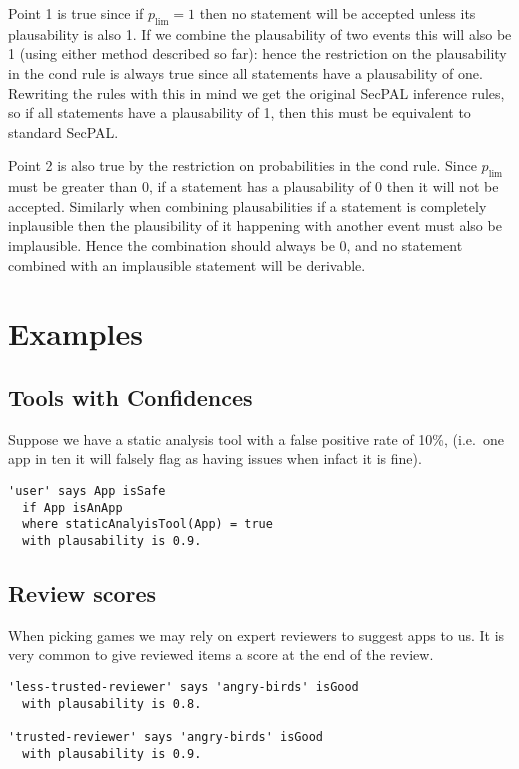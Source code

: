 \documentclass[a4paper]{article}
\begin{document}
Point 1 is true since if $p_{\text{lim}} = 1$ then no statement will be accepted unless its plausability is also 1.
If we combine the plausability of two events this will also be 1 (using either method described so far):
    hence the restriction on the plausability in the cond rule is always true since all statements have a plausability of one.
Rewriting the rules with this in mind we get the original SecPAL inference rules, so if all statements have a plausability of 1, then this must be equivalent to standard SecPAL.

Point 2 is also true by the restriction on probabilities in the cond rule.
Since $p_{\text{lim}}$ must be greater than 0, if a statement has a plausability of 0 then it will not be accepted.
Similarly when combining plausabilities if a statement is completely inplausible then the plausibility of it happening with another event must also be implausible.
Hence the combination should always be 0, and no statement combined with an implausible statement will be derivable.

\section{Examples}

\subsection{Tools with Confidences}

Suppose we have a static analysis tool with a false positive rate of 10\%, (i.e.~one app in ten it will falsely flag as having issues when infact it is fine).

\begin{lstlisting}
'user' says App isSafe
  if App isAnApp
  where staticAnalyisTool(App) = true
  with plausability is 0.9.
\end{lstlisting}

\subsection{Review scores}

When picking games we may rely on expert reviewers to suggest apps to us.
It is very common to give reviewed items a score at the end of the review.

\begin{lstlisting}
'less-trusted-reviewer' says 'angry-birds' isGood
  with plausability is 0.8.

'trusted-reviewer' says 'angry-birds' isGood
  with plausability is 0.9.
\end{lstlisting}
\end{document}
